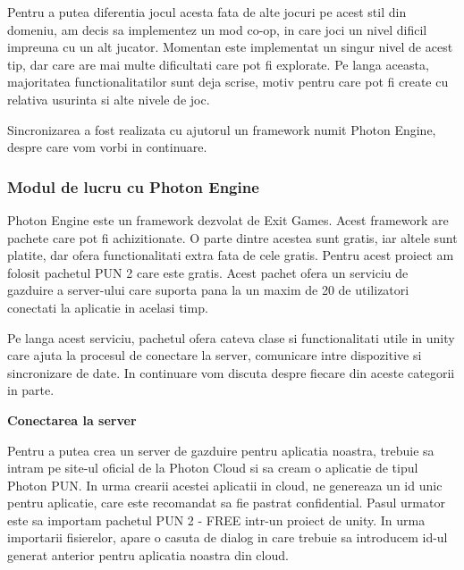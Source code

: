 \documentclass[12pt, a4paper]{article}
\begin{document}
	Pentru a putea diferentia jocul acesta fata de alte jocuri pe acest stil din domeniu, am decis sa implementez un mod co-op, in care joci un nivel dificil impreuna cu un alt jucator. Momentan este implementat un singur nivel de acest tip, dar care are mai multe dificultati care pot fi explorate. Pe langa aceasta, majoritatea functionalitatilor sunt deja scrise, motiv pentru care pot fi create cu relativa usurinta si alte nivele de joc.
	\newline
	
	Sincronizarea a fost realizata cu ajutorul un framework numit Photon Engine, despre care vom vorbi in continuare.
	
	
	
	
	
	\subsubsection{Modul de lucru cu Photon Engine}
	
	Photon Engine este un framework dezvolat de Exit Games. Acest framework are pachete care pot fi achizitionate. O parte dintre acestea sunt gratis, iar altele sunt platite, dar ofera functionalitati extra fata de cele gratis. Pentru acest proiect am folosit pachetul PUN 2 care este gratis. Acest pachet ofera un serviciu de gazduire a server-ului care suporta pana la un maxim de 20 de utilizatori conectati la aplicatie in acelasi timp.
	\newline
	
	Pe langa acest serviciu, pachetul ofera cateva clase si functionalitati utile in unity care ajuta la procesul de conectare la server, comunicare intre dispozitive si sincronizare de date. In continuare vom discuta despre fiecare din aceste categorii in parte.
	\newline
	
	
	
	
	
	\textbf{Conectarea la server}
	\newline
	
	Pentru a putea crea un server de gazduire pentru aplicatia noastra, trebuie sa intram pe site-ul oficial de la Photon Cloud si sa cream o aplicatie de tipul Photon PUN. In urma crearii acestei aplicatii in cloud, ne genereaza un id unic pentru aplicatie, care este recomandat sa fie pastrat confidential. Pasul urmator este sa importam pachetul PUN 2 - FREE intr-un proiect de unity. In urma importarii fisierelor, apare o casuta de dialog in care trebuie sa introducem id-ul generat anterior pentru aplicatia noastra din cloud.
	\newline
	
\end{document}
